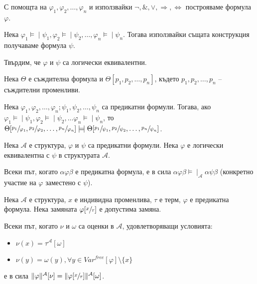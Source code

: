 \documentclass{article}
\newcommand{\mymod}{\models\!\mid}
\begin{document}
\begin{claim}
С помощта на $\varphi_1, \varphi_2, \ldots, \varphi_n$ и използвайки $\neg, \&, \lor, \Rightarrow, \Leftrightarrow$ построяваме формула $\varphi$.

Нека $\varphi_1 \mymod \psi_1, \varphi_2 \mymod \psi_2, \ldots, \varphi_n \mymod \psi_n$. Тогава използвайки същата конструкция получаваме формула $\psi$.

Твърдим, че $\varphi$ и $\psi$ са логически еквивалентни.
\end{claim}

\begin{claim}
Нека $\Theta$ е съждителна формула и $\Theta[p_1, p_2, \ldots, p_n]$, където $p_1, p_2, \ldots, p_n$ -- съждителни променливи.

Нека $\varphi_1, \varphi_2, \ldots, \varphi_n; \psi_1, \psi_2, \ldots, \psi_n$ са предикатни формули. Тогава, ако $\varphi_1 \mymod \psi_1, \varphi_2 \mymod \psi_2, \ldots \varphi_n \mymod \psi_n$, то $\Theta[\sfrac{p_1}{\varphi_1}, \sfrac{p_2}{\varphi_2}, \ldots, \sfrac{p_n}{\varphi_n}] \mymod \Theta[\sfrac{p_1}{\psi_1}, \sfrac{p_2}{\psi_2}, \ldots, \sfrac{p_n}{\psi_n}]$.
\end{claim}

\begin{claim}
Нека $\mathcal{A}$ е структура, $\varphi$ и $\psi$ са предикатни формули. Нека $\varphi$ е логически еквивалентна с $\psi$ в структурата $\mathcal{A}$.

Всеки път, когато  $\alpha\varphi\beta$ е предикатна формула, е в сила $\alpha\varphi\beta \mymod_\mathcal{A} \alpha\psi\beta$ (конкретно участие на $\varphi$ заместено с $\psi$).	
\end{claim}

\begin{claim}
Нека $\mathcal{A}$ е структура, $x$ е индивидна променлива, $\tau$ е терм, $\varphi$ е предикатна формула. Нека замяната $\varphi[\sfrac{x}{\tau}]$ е допустима замяна.

Всеки път, когато $\nu$ и $\omega$ са оценки в $\mathcal{A}$, удовлетворяващи условията:
\begin{itemize}
\item $\nu(x) = \tau^\mathcal{A}[\omega]$
\item $\nu(y) = \omega(y), \forall y \in Var^{free}[\varphi] \setminus \{x\}$
\end{itemize}
е в сила $\|\varphi\|^\mathcal{A}[\nu] = \|\varphi[\sfrac{x}{\tau}]\|^\mathcal{A}[\omega]$.
\end{claim}
\end{document}

